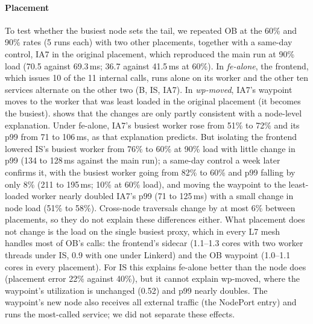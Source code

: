 \paragraph{Placement}
To test whether the busiest node sets the tail, we repeated OB at the 60\% and
90\% rates (5 runs each) with two other placements, together with a same-day
control, IA7 in the original placement, which reproduced the main run at 90\% load (70.5
against 69.3\,ms; 36.7 against 41.5\,ms at 60\%). In \emph{fe-alone}, the frontend, which issues
10 of the 11 internal calls, runs alone on its worker and the other ten
services alternate on the other two (B, IS, IA7). In \emph{wp-moved}, IA7's
waypoint moves to the worker that was least loaded in the original placement
(it becomes the busiest).  shows that
the changes are only partly consistent with a node-level explanation. Under
fe-alone, IA7's busiest worker rose from 51\% to 72\% and its p99 from 71 to
106\,ms, as that explanation predicts. But isolating the frontend lowered
IS's busiest worker from 76\% to 60\% at 90\% load with little change in
p99 (134 to 128\,ms against the main run); a same-day control a week later
confirms it, with the busiest worker going from 82\% to 60\% and p99 falling
by only 8\% (211 to 195\,ms; 10\% at 60\% load), and moving the waypoint to the
least-loaded worker nearly doubled IA7's p99 (71 to 125\,ms) with a small
change in node load (51\% to 58\%). Cross-node traversals change by at most 6\% between
placements, so they do not explain these differences either. What placement
does not change is the load on the single busiest proxy, which in every L7
mesh handles most of OB's calls: the frontend's sidecar (1.1--1.3 cores with
two worker threads under IS, 0.9 with one under Linkerd) and the OB waypoint
(1.0--1.1 cores in every placement). For IS this explains fe-alone better than
the node does (placement error 22\% against 40\%), but it cannot explain
wp-moved, where the waypoint's utilization is unchanged (0.52) and p99 nearly
doubles. The waypoint's new node also receives all external traffic (the
NodePort entry) and runs the most-called service; we did not separate these
effects.

